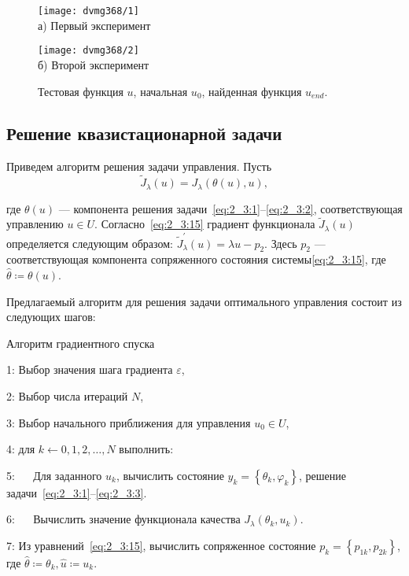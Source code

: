\begin{figure}[ht]
    \begin{minipage}[b][][b]{0.49\linewidth}
        \centering
        \texttt{[image: dvmg368/1]} \\ а) Первый эксперимент
    \end{minipage}
    \hfill
    \begin{minipage}[b][][b]{0.49\linewidth}
        \centering
        \texttt{[image: dvmg368/2]} \\ б) Второй эксперимент
    \end{minipage}
    \caption{Тестовая функция $u$, начальная $u_0$, найденная функция $u_{end}.$}
    \label{fig:4_3:control}
\end{figure}

\subsection{Решение квазистационарной задачи}
\label{subsec:ch4/sec3/quasistationary}
Приведем алгоритм решения задачи управления.
Пусть
\[
    \widetilde{J}_{\lambda}(u)=J_{\lambda}(\theta(u), u),
\]

где $\theta(u)$ — компонента решения
задачи~\eqref{eq:2_3:1}--\eqref{eq:2_3:2},
соответствующая управлению $u \in U$.
Согласно~\eqref{eq:2_3:15} градиент функционала
$\widetilde{J}_{\lambda}(u)$ определяется
следующим образом: $\widetilde{J}_{\lambda}^{\prime}(u) = \lambda u-p_{2}$.
Здесь $p_{2}$ — соответствующая компонента сопряженного
состояния системы\eqref{eq:2_3:15}, где $\widehat{\theta}\coloneqq\theta(u)$.


Предлагаемый алгоритм для решения задачи оптимального управления
состоит из следующих шагов:

Алгоритм градиентного спуска

1: Выбор значения шага градиента $\varepsilon$,

2: Выбор числа итераций $N$,

3: Выбор начального приближения для управления $u_{0} \in U$,

4: для $k \leftarrow 0,1,2, \ldots, N$ выполнить:

5: $\quad$ Для заданного $u_{k}$, вычислить состояние
$y_{k}=\left\{\theta_{k}, \varphi_{k}\right\}$, решение
задачи~\eqref{eq:2_3:1}--\eqref{eq:2_3:3}.

6: $\quad$ Вычислить значение функционала качества
$J_{\lambda}\left(\theta_{k}, u_{k}\right)$.

7: Из уравнений~\eqref{eq:2_3:15}, вычислить сопряженное
состояние $p_{k}=\left\{p_{1 k}, p_{2 k}\right\}$,
где $\widehat{\theta} \coloneqq \theta_{k}, \widehat{u} \coloneqq u_{k}$.

